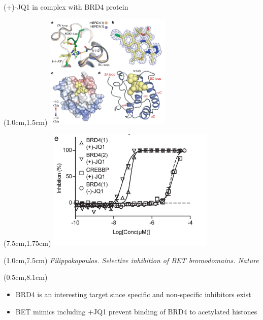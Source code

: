 \documentclass{beamer}					%
\begin{document}
\begin{frame}{(+)-JQ1 in complex with BRD4 protein}

\begin{textblock*}{6cm}(1.0cm,1.5cm)
\includegraphics[width=6cm]{JQ1_Complex.png}
\end{textblock*}

\begin{textblock*}{8cm}(7.5cm,1.75cm)
\includegraphics[width=8cm]{BRD4-Inhibition.png}
\end{textblock*}

\begin{textblock*}{\textwidth}(1.0cm,7.5cm)
\textit{Filippakopoulos. Selective inhibition of BET bromodomains. Nature }

\begin{textblock*}{14cm}(0.5cm,8.1cm)
\begin{itemize}
\item BRD4 is an interesting target since specific and non-specific inhibitors exist
\item BET mimics including +JQ1 prevent binding of BRD4 to acetylated histones
\end{itemize}
\end{textblock*}

\end{textblock*}

\end{frame}
\end{document}
